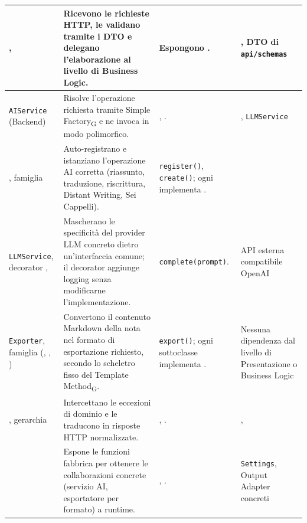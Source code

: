 \begin{xltabular}{\textwidth}{|>{\raggedright\arraybackslash\small}p{2.3cm}|p{5cm}|X|X|}
	\texttt{}, \texttt{} & Ricevono le richieste HTTP, le validano tramite i DTO e delegano l'elaborazione al livello di Business Logic. & Espongono \texttt{}. & \texttt{}, DTO di \texttt{api/schemas} \\ \hline
	\texttt{AIService} (Backend) & Risolve l'operazione richiesta tramite Simple Factory\textsubscript{G} e ne invoca \texttt{} in modo polimorfico. & \texttt{}, \texttt{}. & \texttt{}, \texttt{LLMService} \\ \hline
	\texttt{}, famiglia \texttt{} & Auto-registrano e istanziano l'operazione AI corretta (riassunto, traduzione, riscrittura, Distant Writing, Sei Cappelli). & \texttt{register()}, \texttt{create()}; ogni \texttt{} implementa \texttt{}. & \texttt{} \\ \hline
	\texttt{LLMService}, decorator \texttt{}, \texttt{} & Mascherano le specificità del provider LLM concreto dietro un'interfaccia comune; il decorator aggiunge logging senza modificarne l'implementazione. & \texttt{complete(prompt)}. & API esterna compatibile OpenAI \\ \hline
	\texttt{Exporter}, famiglia (\texttt{}, \texttt{}, \texttt{}) & Convertono il contenuto Markdown della nota nel formato di esportazione richiesto, secondo lo scheletro fisso del Template Method\textsubscript{G}. & \texttt{export()}; ogni sottoclasse implementa \texttt{}. & Nessuna dipendenza dal livello di Presentazione o Business Logic \\ \hline
	\texttt{}, gerarchia \texttt{} & Intercettano le eccezioni di dominio e le traducono in risposte HTTP normalizzate. & \texttt{}, \texttt{}. & \texttt{}, \texttt{} \\ \hline
	\texttt{} & Espone le funzioni fabbrica per ottenere le collaborazioni concrete (servizio AI, esportatore per formato) a runtime. & \texttt{}, \texttt{}. & \texttt{Settings}, Output Adapter concreti \\ \hline
\end{xltabular}

\FloatBarrier
